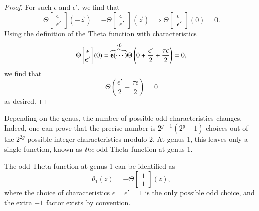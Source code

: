 \begin{proof}
    For such $\epsilon$ and $\epsilon'$, we find that
    \begin{equation}
        \Theta\begin{bmatrix}\epsilon \\ \epsilon'\end{bmatrix}(-\vec z) = -\Theta\begin{bmatrix}\epsilon \\ \epsilon'\end{bmatrix}(\vec z) \implies \Theta\begin{bmatrix}\epsilon \\ \epsilon'\end{bmatrix}(0) = 0.
    \end{equation}
    Using the definition of the Theta function with characteristics
    \begin{equation}
        \Theta\begin{bmatrix}\epsilon \\ \epsilon'\end{bmatrix}(0) = \overset{\neq 0}{\overbrace{\mathbf{e}( \cdots )}}\Theta\left(0+ \frac{\epsilon'}{2}+\frac{\tau\epsilon}{2}\right) = 0,
    \end{equation}
    we find that
    \begin{equation}
        \Theta\left(\frac{\epsilon'}{2}+\frac{\tau\epsilon}{2}\right) = 0
    \end{equation}
    as desired.
\end{proof}

Depending on the genus, the number of possible odd characteristics changes. Indeed, one can prove that the precise number is $2^{g-1}(2^g-1)$ choices out of the $2^{2g}$ possible integer characteristics modulo 2. At genus 1, this leaves only a single function, known as \emph{the} odd Theta function at genus 1.

\begin{definition}
    The odd Theta function at genus 1 can be identified as
    \begin{equation}
        \theta_1(z) = -\Theta \begin{bmatrix}1 \\ 1\end{bmatrix} (z),
    \end{equation}
    where the choice of characteristics $\epsilon=\epsilon'=1$ is the only possible odd choice, and the extra $-1$ factor exists by convention.
\end{definition}

